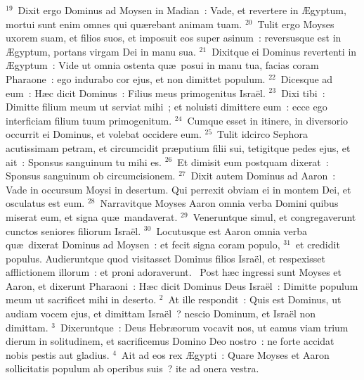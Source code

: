 ${}^{19}$~Dixit ergo Dominus ad Moysen in Madian~: Vade, et revertere in \AE gyptum, mortui sunt enim omnes qui qu\ae rebant animam tuam.
${}^{20}$~Tulit ergo Moyses uxorem suam, et filios suos, et imposuit eos super asinum~: reversusque est in \AE gyptum, portans virgam Dei in manu sua.
${}^{21}$~Dixitque ei Dominus revertenti in \AE gyptum~: Vide ut omnia ostenta qu\ae\ posui in manu tua, facias coram Pharaone~: ego indurabo cor ejus, et non dimittet populum.
${}^{22}$~Dicesque ad eum~: H\ae c dicit Dominus~: Filius meus primogenitus Isra\"el.
${}^{23}$~Dixi tibi~: Dimitte filium meum ut serviat mihi~; et noluisti dimittere eum~: ecce ego interficiam filium tuum primogenitum.
${}^{24}$~Cumque esset in itinere, in diversorio occurrit ei Dominus, et volebat occidere eum.
${}^{25}$~Tulit idcirco Sephora acutissimam petram, et circumcidit pr\ae putium filii sui, tetigitque pedes ejus, et ait~: Sponsus sanguinum tu mihi es.
${}^{26}$~Et dimisit eum postquam dixerat~: Sponsus sanguinum ob circumcisionem.
${}^{27}$~Dixit autem Dominus ad Aaron~: Vade in occursum Moysi in desertum. Qui perrexit obviam ei in montem Dei, et osculatus est eum.
${}^{28}$~Narravitque Moyses Aaron omnia verba Domini quibus miserat eum, et signa qu\ae\ mandaverat.
${}^{29}$~Veneruntque simul, et congregaverunt cunctos seniores filiorum Isra\"el.
${}^{30}$~Locutusque est Aaron omnia verba qu\ae\ dixerat Dominus ad Moysen~: et fecit signa coram populo,
${}^{31}$~et credidit populus. Audieruntque quod visitasset Dominus filios Isra\"el, et respexisset afflictionem illorum~: et proni adoraverunt.
~\lettrine[lines=10,image=true,loversize=0.05,lraise=-0.03]{P}{}ost h\ae c ingressi sunt Moyses et Aaron, et dixerunt Pharaoni~: H\ae c dicit Dominus Deus Isra\"el~: Dimitte populum meum ut sacrificet mihi in deserto.
${}^{2}$~At ille respondit~: Quis est Dominus, ut audiam vocem ejus, et dimittam Isra\"el~? nescio Dominum, et Isra\"el non dimittam.
${}^{3}$~Dixeruntque~: Deus Hebr\ae orum vocavit nos, ut eamus viam trium dierum in solitudinem, et sacrificemus Domino Deo nostro~: ne forte accidat nobis pestis aut gladius.
${}^{4}$~Ait ad eos rex \AE gypti~: Quare Moyses et Aaron sollicitatis populum ab operibus suis~? ite ad onera vestra.


